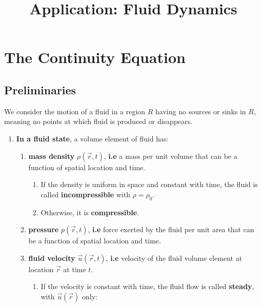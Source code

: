 \documentclass[11pt]{article}
\title{Application: Fluid Dynamics}
\begin{document}
\maketitle
    \section{The Continuity Equation}\label{sec:the-continuity-equation}
        \subsection{Preliminaries}\label{subsec:preliminaries}
            We consider the motion of a fluid in a region $R$ having no sources or sinks in $R$, meaning 
            no points at which fluid is produced or disappears.\\
            \begin{enumerate}
                \item \textbf{In a fluid state}, a volume element of fluid has:\begin{enumerate}
                          \item \textbf{mass density} $\rho(\vec{r}, t)$, \textbf{i.e} a mass per unit volume that
                          can be a function of spatial location and time.
                          \begin{enumerate}
                              \item If the density is uniform in space and constant with time, the fluid is called \textbf{incompressible} with $\rho = \rho_0$.
                              \item Otherwise, it is \textbf{compressible}.
                          \end{enumerate}
                          \item \textbf{pressure} $p(\vec{r},t)$, \textbf{i.e} force exerted by the fluid per unit area that can be a function of spatial location and time.
                          \item \textbf{fluid velocity} $\vec{u}(\vec{r},t)$, \textbf{i.e} velocity of the fluid volume element at location $\vec{r}$ at time $t$.
                                                                                   \begin{enumerate}
                                                                                       \item If the velocity is constant with time, the fluid flow is called \textbf{steady}, with $\vec{u}(\vec{r})$ only:
                                                                                                \begin{subequations}

\end{subequations}
\end{enumerate}
\end{enumerate}
\end{enumerate}
\end{document}
